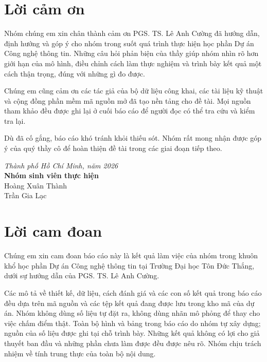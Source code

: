 \documentclass[12pt,a4paper,oneside]{report}
\begin{document}

\chapter*{Lời cảm ơn}

Nhóm chúng em xin chân thành cảm ơn PGS. TS. Lê Anh Cường đã hướng dẫn, định hướng và góp ý cho nhóm trong suốt quá trình thực hiện học phần Dự án Công nghệ thông tin. Những câu hỏi phản biện của thầy giúp nhóm nhìn rõ hơn giới hạn của mô hình, điều chỉnh cách làm thực nghiệm và trình bày kết quả một cách thận trọng, đúng với những gì đo được.

Chúng em cũng cảm ơn các tác giả của bộ dữ liệu công khai, các tài liệu kỹ thuật và cộng đồng phần mềm mã nguồn mở đã tạo nền tảng cho đề tài. Mọi nguồn tham khảo đều được ghi lại ở cuối báo cáo để người đọc có thể tra cứu và kiểm tra lại.

Dù đã cố gắng, báo cáo khó tránh khỏi thiếu sót. Nhóm rất mong nhận được góp ý của quý thầy cô để hoàn thiện đề tài trong các giai đoạn tiếp theo.

\begin{flushright}
\textit{Thành phố Hồ Chí Minh, năm 2026}\\
\textbf{Nhóm sinh viên thực hiện}\\[1cm]
Hoàng Xuân Thành\\
Trần Gia Lạc
\end{flushright}

\chapter*{Lời cam đoan}

Chúng em xin cam đoan báo cáo này là kết quả làm việc của nhóm trong khuôn khổ học phần Dự án Công nghệ thông tin tại Trường Đại học Tôn Đức Thắng, dưới sự hướng dẫn của PGS. TS. Lê Anh Cường.

Các mô tả về thiết kế, dữ liệu, cách đánh giá và các con số kết quả trong báo cáo đều dựa trên mã nguồn và các tệp kết quả đang được lưu trong kho mã của dự án. Nhóm không dùng số liệu tự đặt ra, không dùng nhãn mô phỏng để thay cho việc chấm điểm thật. Toàn bộ hình và bảng trong báo cáo do nhóm tự xây dựng; nguồn của số liệu được ghi tại chỗ trình bày. Những kết quả không có lợi cho giả thuyết ban đầu và những phần chưa làm được đều được nêu rõ. Nhóm chịu trách nhiệm về tính trung thực của toàn bộ nội dung.
\end{document}
